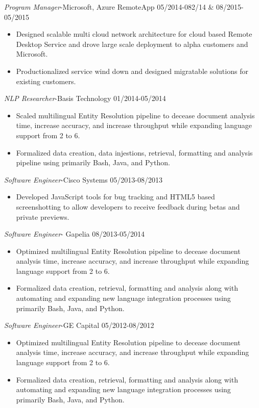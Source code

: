 \documentclass[line,margin]{res}
\begin{document}
\begin{resume}
\begin{itemize}
\end{itemize}
{\sl Program Manager}-Microsoft, Azure RemoteApp  \hfill 05/2014-082/14 \& 08/2015-05/2015
\begin{itemize}  \itemsep -4pt
\item Designed scalable multi cloud network architecture for cloud based Remote Desktop Service and drove large scale deployment to alpha customers and Microsoft.
\item Productionalized service wind down and designed migratable solutions for existing customers.
\end{itemize}
{\sl NLP Researcher}-Basis Technology \hfill 01/2014-05/2014
\begin{itemize}  \itemsep -4pt
\item Scaled multilingual Entity Resolution pipeline to decease document analysis time, increase accuracy, and increase throughput while expanding language support from 2 to 6.
\item Formalized data creation, data injestions, retrieval, formatting and analysis pipeline using primarily Bash, Java, and Python.
\end{itemize}
{\sl Software Engineer}-Cisco Systems \hfill 05/2013-08/2013
\begin{itemize}  \itemsep -4pt
\item Developed JavaScript tools for bug tracking and HTML5 based screenshotting to allow developers to receive feedback during betas and private previews. 
\end{itemize}
{\sl Software Engineer}- Gapelia \hfill 08/2013-05/2014
\begin{itemize}  \itemsep -4pt
\item Optimized multilingual Entity Resolution pipeline to decease document analysis time, increase accuracy, and increase throughput while expanding language support from 2 to 6.
\item Formalized data creation, retrieval, formatting and analysis along with automating and expanding new language integration processes using primarily Bash, Java, and Python.
\end{itemize}
{\sl Software Engineer}-GE Capital \hfill 05/2012-08/2012
\begin{itemize}  \itemsep -4pt
\item Optimized multilingual Entity Resolution pipeline to decease document analysis time, increase accuracy, and increase throughput while expanding language support from 2 to 6.
\item Formalized data creation, retrieval, formatting and analysis along with automating and expanding new language integration processes using primarily Bash, Java, and Python.

\end{itemize}
\end{resume}
\end{document}
